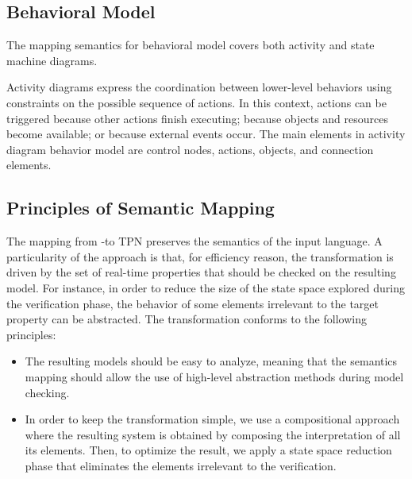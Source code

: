 \subsection{Behavioral Model}
The mapping semantics for behavioral model covers both activity and
state machine diagrams.

Activity diagrams express the coordination between lower-level
behaviors using constraints on the possible sequence of actions. In
this context, actions can be triggered because other actions finish
executing; because objects and resources become available; or because
external events occur. The main elements in \uml activity diagram
behavior model are control nodes, actions, objects, and connection
elements.


\subsection{Principles of Semantic Mapping}

The mapping from \uml-\marte to TPN preserves the semantics of the
input language. A particularity of the approach is that, for
efficiency reason, the transformation is driven by the set of
real-time properties that should be checked on the resulting
model. For instance, in order to reduce the size of the state space
explored during the verification phase, the behavior of some elements
irrelevant to the target property can be abstracted. The
transformation conforms to the following principles:
\begin{itemize}
\item The resulting \tpn models should be easy to analyze, meaning
  that the semantics mapping should allow the use of high-level
  abstraction methods during model checking.
\item In order to keep the transformation simple, we use a
  compositional approach where the resulting system is obtained by
  composing the interpretation of all its elements. Then, to optimize
  the result, we apply a state space reduction phase that eliminates
  the elements irrelevant to the verification.
\end{itemize}



